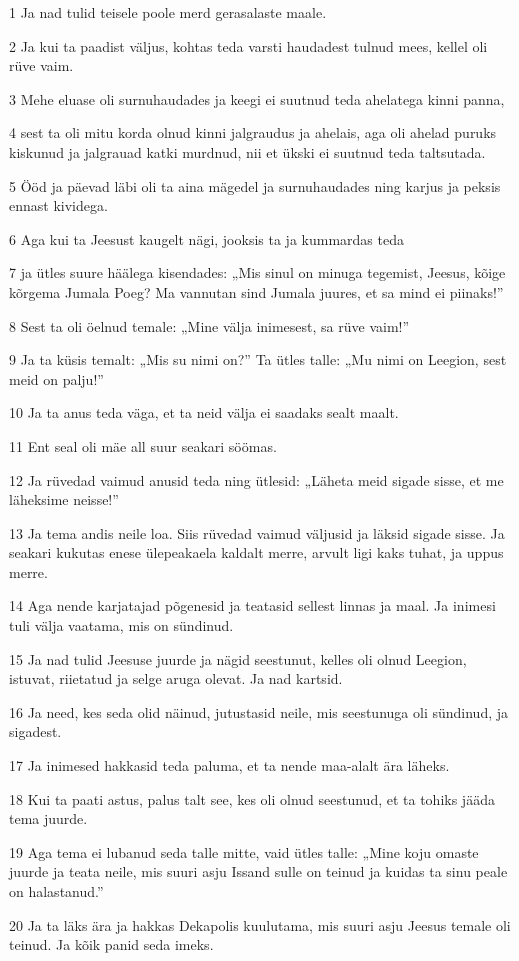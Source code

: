 \par 1 Ja nad tulid teisele poole merd gerasalaste maale.
\par 2 Ja kui ta paadist väljus, kohtas teda varsti haudadest tulnud mees, kellel oli rüve vaim.
\par 3 Mehe eluase oli surnuhaudades ja keegi ei suutnud teda ahelatega kinni panna,
\par 4 sest ta oli mitu korda olnud kinni jalgraudus ja ahelais, aga oli ahelad puruks kiskunud ja jalgrauad katki murdnud, nii et ükski ei suutnud teda taltsutada.
\par 5 Ööd ja päevad läbi oli ta aina mägedel ja surnuhaudades ning karjus ja peksis ennast kividega.
\par 6 Aga kui ta Jeesust kaugelt nägi, jooksis ta ja kummardas teda
\par 7 ja ütles suure häälega kisendades: „Mis sinul on minuga tegemist, Jeesus, kõige kõrgema Jumala Poeg? Ma vannutan sind Jumala juures, et sa mind ei piinaks!”
\par 8 Sest ta oli öelnud temale: „Mine välja inimesest, sa rüve vaim!”
\par 9 Ja ta küsis temalt: „Mis su nimi on?” Ta ütles talle: „Mu nimi on Leegion, sest meid on palju!”
\par 10 Ja ta anus teda väga, et ta neid välja ei saadaks sealt maalt.
\par 11 Ent seal oli mäe all suur seakari söömas.
\par 12 Ja rüvedad vaimud anusid teda ning ütlesid: „Läheta meid sigade sisse, et me läheksime neisse!”
\par 13 Ja tema andis neile loa. Siis rüvedad vaimud väljusid ja läksid sigade sisse. Ja seakari kukutas enese ülepeakaela kaldalt merre, arvult ligi kaks tuhat, ja uppus merre.
\par 14 Aga nende karjatajad põgenesid ja teatasid sellest linnas ja maal. Ja inimesi tuli välja vaatama, mis on sündinud.
\par 15 Ja nad tulid Jeesuse juurde ja nägid seestunut, kelles oli olnud Leegion, istuvat, riietatud ja selge aruga olevat. Ja nad kartsid.
\par 16 Ja need, kes seda olid näinud, jutustasid neile, mis seestunuga oli sündinud, ja sigadest.
\par 17 Ja inimesed hakkasid teda paluma, et ta nende maa-alalt ära läheks.
\par 18 Kui ta paati astus, palus talt see, kes oli olnud seestunud, et ta tohiks jääda tema juurde.
\par 19 Aga tema ei lubanud seda talle mitte, vaid ütles talle: „Mine koju omaste juurde ja teata neile, mis suuri asju Issand sulle on teinud ja kuidas ta sinu peale on halastanud.”
\par 20 Ja ta läks ära ja hakkas Dekapolis kuulutama, mis suuri asju Jeesus temale oli teinud. Ja kõik panid seda imeks.

